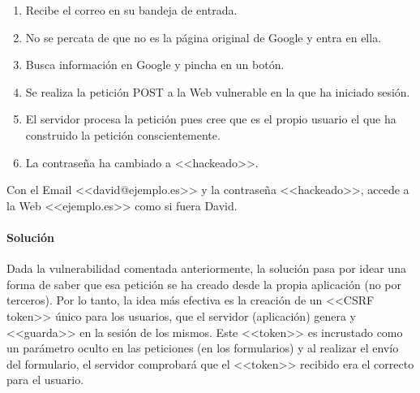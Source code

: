\begin{tcolorbox}[colback=green!5!white,colframe=green!75!black,title=David]
    \begin{enumerate}
        \item Recibe el correo en su bandeja de entrada.
        \item No se percata de que no es la página original de Google y entra en ella.
        \item Busca información en Google y pincha en un botón.
        \item Se realiza la petición POST a la Web vulnerable en la que ha iniciado sesión.
        \item El servidor procesa la petición pues cree que es el propio usuario el que ha
        construido la petición conscientemente.
        \item La contraseña ha cambiado a <<hackeado>>.
    \end{enumerate}
\end{tcolorbox}

\begin{tcolorbox}[colback=red!5!white,colframe=red!75!black,title=Atacante]

Con el Email <<david@ejemplo.es>> y la contraseña <<hackeado>>, accede a la Web
<<ejemplo.es>> como si fuera David.

\end{tcolorbox}

\paragraph{Solución} Dada la vulnerabilidad comentada anteriormente, la solución pasa por idear una
forma de saber que esa petición se ha creado desde la propia aplicación (no por
terceros). Por lo tanto, la idea más efectiva es la creación de un <<CSRF
token>> único para los usuarios, que el servidor (aplicación) genera y
<<guarda>> en la sesión de los mismos. Este <<token>> es incrustado como un
parámetro oculto en las peticiones (en los formularios) y al realizar el envío
del formulario, el servidor comprobará que el <<token>> recibido era el correcto
para el usuario.

